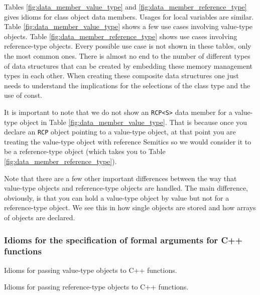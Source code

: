 \documentclass[pdf,ps2pdf,11pt]{SANDreport}
\begin{document}
Tables {}\ref{fig:data_member_value_type} and
{}\ref{fig:data_member_reference_type} gives idioms for class object
data members.  Usages for local variables are similar.  Table
{}\ref{fig:data_member_value_type} shows a few use cases involving
value-type objects.  Table {}\ref{fig:data_member_reference_type}
shows use cases involving reference-type objects.  Every possible use
case is not shown in these tables, only the most common ones.  There
is almost no end to the number of different types of data structures
that can be created by embedding these memory management types in each
other.  When creating these composite data structures one just needs
to understand the implications for the selections of the class type
and the use of const.

It is important to note that we do not show an {}\texttt{RCP<S>} data
member for a value-type object in Table
{}\ref{fig:data_member_value_type}.  That is because once you declare
an {}\texttt{RCP} object pointing to a value-type object, at that
point you are treating the value-type object with reference Semitics
so we would consider it to be a reference-type object (which takes you
to Table {}\ref{fig:data_member_reference_type}).

Note that there are a few other important differences between the way
that value-type objects and reference-type objects are handled.  The
main difference, obviously, is that you can hold a value-type object
by value but not for a reference-type object.  We see this in how
single objects are stored and how arrays of objects are declared.


%
{}\subsubsection{Idioms for the specification of formal arguments for
C++ functions}
\label{sec:idioms-for-passing-arguments}
%

\begin{table}[p]
%
\begin{center}
%
%

%
%
%
\end{center}
\caption{\label{fig:func_args_value_type}
Idioms for passing value-type objects to C++ functions.}
%
\end{table}


\begin{table}[p]
%
\begin{center}

\end{center}
\caption{\label{fig:func_args_ref_type}
Idioms for passing reference-type objects to C++ functions.}
\end{table}
\end{document}
